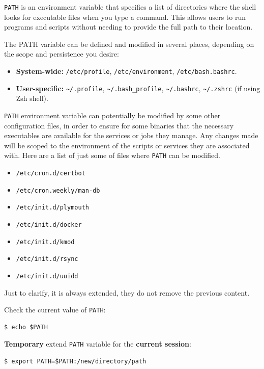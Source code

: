 \documentclass{article}
\newenvironment{blocktemplateIII}[1]{%
    \tcolorbox[beamer,%
    noparskip,breakable,
    ,colframe=Red,%
    colbacklower=LimeGreen!75!LightGreen,%
    title=#1]}%
    {\endtcolorbox}
\newenvironment{codetemplate}[1][]{%
  \mybasecolorbox[#1]
  \itshape
}{%
  \endmybasecolorbox
}
\begin{document}
\verb|PATH| is an environment variable that specifies a list of directories where the shell looks for executable files when you type a command. This allows users to run programs and scripts without needing to provide the full path to their location.

The PATH variable can be defined and modified in several places, depending on the scope and persistence you desire:

\begin{itemize}
    \item \textbf{System-wide:} \verb|/etc/profile|, \verb|/etc/environment|, \verb|/etc/bash.bashrc|.
    \item \textbf{User-specific:} \verb|~/.profile|, \verb|~/.bash_profile|, \verb|~/.bashrc|, \verb|~/.zshrc| (if using Zsh shell).
\end{itemize}

\begin{blocktemplateIII}{Warning}
\verb|PATH| environment variable can potentially be modified by some other configuration files, in order to ensure for some binaries that the necessary executables are available for the services or jobs they manage. Any changes made will be scoped to the environment of the scripts or services they are associated with. Here are a list of just some of files where \verb|PATH| can be modified. 
\begin{itemize}
    \item \verb|/etc/cron.d/certbot|
    \item \verb|/etc/cron.weekly/man-db|
    \item \verb|/etc/init.d/plymouth|
    \item \verb|/etc/init.d/docker|
    \item \verb|/etc/init.d/kmod|
    \item \verb|/etc/init.d/rsync|
    \item \verb|/etc/init.d/uuidd|
\end{itemize}
Just to clarify, it is always extended, they do not remove the previous content.
\end{blocktemplateIII}

Check the current value of \verb|PATH|:
\begin{codetemplate}{}
\begin{verbatim}
$ echo $PATH
\end{verbatim}
\end{codetemplate}

\textbf{Temporary} extend \verb|PATH| variable for the \textbf{current session}:
\begin{codetemplate}{}
\begin{verbatim}
$ export PATH=$PATH:/new/directory/path
\end{verbatim}
\end{codetemplate}
\end{document}
